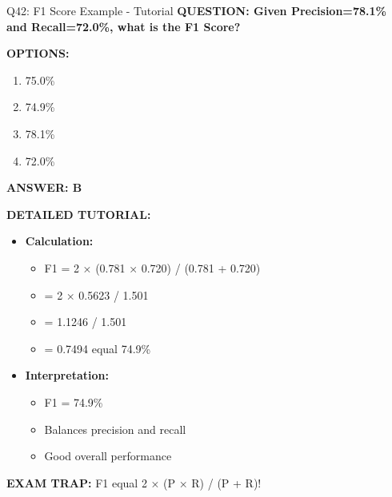 \documentclass[8pt]{beamer}
\begin{document}
	\begin{frame}{Q42: F1 Score Example - Tutorial}
		\fontsize{6.5}{7.5}\selectfont
		\textbf{QUESTION: Given Precision=78.1\% and Recall=72.0\%, what is the F1 Score?}
		
		\vspace{0.1cm}
		\textbf{OPTIONS:}
		\begin{enumerate}
			\item 75.0\%
			\item 74.9\%
			\item 78.1\%
			\item 72.0\%
		\end{enumerate}
		
		\vspace{0.1cm}
		\textcolor{myblue}{\textbf{ANSWER: B}}
		
		\vspace{0.1cm}
		\textbf{DETAILED TUTORIAL:}
		\begin{itemize}
			\item \textbf{Calculation:}
			\begin{itemize}
				\item F1 = 2 × (0.781 × 0.720) / (0.781 + 0.720)
				\item = 2 × 0.5623 / 1.501
				\item = 1.1246 / 1.501
				\item = 0.7494 equal 74.9\%
			\end{itemize}
			\item \textbf{Interpretation:}
			\begin{itemize}
				\item F1 = 74.9\%
				\item Balances precision and recall
				\item Good overall performance
			\end{itemize}
		\end{itemize}
		
		\textcolor{myred}{\textbf{EXAM TRAP:}} F1 equal \textcolor{myblue}{2 × (P × R) / (P + R)}!
	\end{frame}
	
\end{document}
